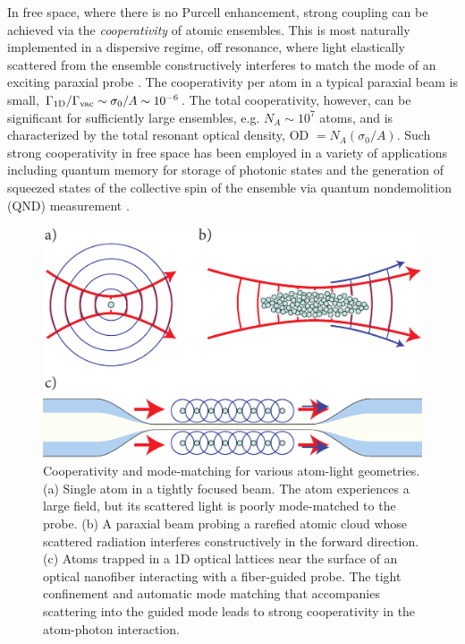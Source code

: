 \documentclass[aps,pra,twocolumn]{revtex4-1} %
\newcommand{\oneD}{{\rm 1D}}
\newcommand{\vac}{{\rm vac}}
\begin{document}
In free space, where there is no Purcell enhancement, strong coupling can be achieved via the {\em cooperativity} of atomic ensembles.  
This is most naturally implemented in a dispersive regime, off resonance, where light elastically scattered from the ensemble constructively interferes to match the mode of an exciting paraxial probe \cite{baragiola_three-dimensional_2014}.  The cooperativity per atom in a typical paraxial beam is small, $\Gamma_{\oneD}/\Gamma_{\vac} \sim \sigma_0/A  \sim 10^{-6}$.  
The total cooperativity, however, can be significant for sufficiently large ensembles, e.g. $N_A \sim  10^7$ atoms, and is characterized by the total resonant optical density, OD $= N_A (\sigma_0/A)$.  
Such strong cooperativity in free space has been employed in a variety of applications including quantum memory for storage of photonic states \cite{chaneliere_storage_2005} and the generation of squeezed states of the collective spin of the ensemble via quantum nondemolition (QND) measurement \cite{kuzmich_generation_2000, appel_mesoscopic_2009, takano_spin_2009, sewell_magnetic_2012}.   

\begin{figure}
\includegraphics[scale=0.80]{./Figs/Fig_ModeMatch}
\caption{Cooperativity and mode-matching for various atom-light geometries. (a) Single atom in a tightly focused beam. The atom experiences a large field, but its scattered light is poorly mode-matched to the probe. (b) A paraxial beam probing a rarefied atomic cloud whose scattered radiation interferes constructively in the forward direction. (c) Atoms trapped in a 1D optical lattices  near the surface of an optical nanofiber interacting with a fiber-guided probe. The tight confinement and automatic mode matching {\color{blue} that accompanies} scattering into the guided mode leads to strong cooperativity in the atom-photon interaction.}\label{Fig::ModeMatching}
\end{figure}
\end{document}
